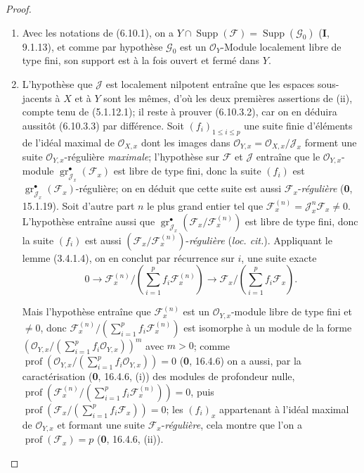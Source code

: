 \begin{proof}
\begin{enumerate}
\item[(i)] Avec les notations de (6.10.1), on a
$Y\cap\operatorname{Supp}(\mathcal F)=\operatorname{Supp}(\mathcal G_0)$
(\textbf{I}, 9.1.13), et comme par hypothèse $\mathcal G_0$ est un
$\mathcal O_Y$-Module localement libre de type fini, son support est à la fois
ouvert et fermé dans $Y$.


\item[(ii)] L'hypothèse que $\mathcal J$ est localement nilpotent entraîne que
les espaces sous-jacents à $X$ et à $Y$ sont les mêmes, d'où les deux premières
assertions de (ii), compte tenu de (5.1.12.1); il reste à prouver (6.10.3.2),
car on en déduira aussitôt (6.10.3.3) par différence. Soit
$(f_i)_{1\leq i\leq p}$ une suite finie d'éléments de l'idéal maximal de
$\mathcal O_{X,x}$ dont les images dans
$\mathcal O_{Y,x}=\mathcal O_{X,x}/\mathcal J_x$ forment une suite
$\mathcal O_{Y,x}$-régulière \emph{maximale}; l'hypothèse sur $\mathcal F$ et
$\mathcal J$ entraîne que le $\mathcal O_{Y,x}$-module
$\operatorname{gr}_{\mathcal J_x}^{\bullet}(\mathcal F_x)$ est libre de type
fini, donc la suite $(f_i)$ est
$\operatorname{gr}_{\mathcal J_x}^{\bullet}(\mathcal F_x)$-régulière; on en
déduit que cette suite est aussi $\mathcal F_x$-\emph{régulière} (\textbf{0}, 15.1.19). Soit
d'autre part $n$ le plus grand entier tel que
$\mathcal F_x^{(n)}=\mathcal J_x^n\mathcal F_x\ne0$. L'hypothèse entraîne
aussi que
$\operatorname{gr}_{\mathcal J_x}^{\bullet}
(\mathcal F_x/\mathcal F_x^{(n)})$ est libre de type fini, donc la suite
$(f_i)$ est aussi $(\mathcal F_x/\mathcal F_x^{(n)})$-\emph{régulière}
(\emph{loc. cit.}). Appliquant le lemme (3.4.1.4), on en conclut par récurrence
sur $i$, une suite exacte
\[
0\longrightarrow
\mathcal F_x^{(n)}/\left(\sum_{i=1}^{p}f_i\mathcal F_x^{(n)}\right)
\longrightarrow
\mathcal F_x/\left(\sum_{i=1}^{p}f_i\mathcal F_x\right).
\]

Mais l'hypothèse entraîne que $\mathcal F_x^{(n)}$ est un
$\mathcal O_{Y,x}$-module libre de type fini et $\ne0$, donc
$\mathcal F_x^{(n)}/(\sum_{i=1}^{p}f_i\mathcal F_x^{(n)})$ est isomorphe à
un module de la forme
$(\mathcal O_{Y,x}/(\sum_{i=1}^{p}f_i\mathcal O_{Y,x}))^m$ avec $m>0$; comme
$\operatorname{prof}(\mathcal O_{Y,x}/(\sum_{i=1}^{p}f_i\mathcal O_{Y,x}))=0$
(\textbf{0}, 16.4.6) on a aussi, par la caractérisation (\textbf{0}, 16.4.6, (i)) des modules
de profondeur nulle,
$\operatorname{prof}(\mathcal F_x^{(n)}/(\sum_{i=1}^{p}f_i\mathcal F_x^{(n)}))=0$,
puis
$\operatorname{prof}(\mathcal F_x/(\sum_{i=1}^{p}f_i\mathcal F_x))=0$;
les $(f_i)_x$ appartenant à l'idéal maximal de $\mathcal O_{Y,x}$ et formant
une suite $\mathcal F_x$-\emph{régulière}, cela montre que l'on a
$\operatorname{prof}(\mathcal F_x)=p$ (\textbf{0}, 16.4.6, (ii)).
\end{enumerate}
\end{proof}

